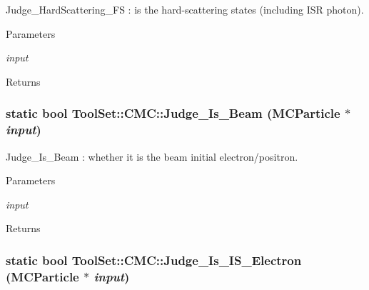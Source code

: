 Judge\_\-HardScattering\_\-FS : is the hard-\/scattering states (including ISR photon). 
\begin{DoxyParams}{Parameters}
\item[{\em input}]\end{DoxyParams}
\begin{DoxyReturn}{Returns}

\end{DoxyReturn}
\hypertarget{classToolSet_1_1CMC_aa63f12865d46af350674c7dca3eb5437}{
\subsubsection[{Judge\_\-Is\_\-Beam}]{\setlength{\rightskip}{0pt plus 5cm}static bool ToolSet::CMC::Judge\_\-Is\_\-Beam (MCParticle $\ast$ {\em input})}}
\label{classToolSet_1_1CMC_aa63f12865d46af350674c7dca3eb5437}


Judge\_\-Is\_\-Beam : whether it is the beam initial electron/positron. 
\begin{DoxyParams}{Parameters}
\item[{\em input}]\end{DoxyParams}
\begin{DoxyReturn}{Returns}

\end{DoxyReturn}
\hypertarget{classToolSet_1_1CMC_a0630c44bcd0eaf761f4b34e106f2b9d9}{
\subsubsection[{Judge\_\-Is\_\-IS\_\-Electron}]{\setlength{\rightskip}{0pt plus 5cm}static bool ToolSet::CMC::Judge\_\-Is\_\-IS\_\-Electron (MCParticle $\ast$ {\em input})}}
\label{classToolSet_1_1CMC_a0630c44bcd0eaf761f4b34e106f2b9d9}


